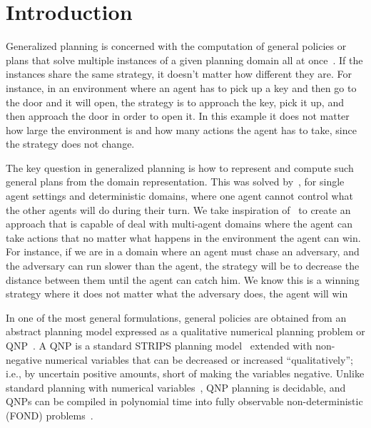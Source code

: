 \documentclass[a4paper]{article}
\begin{document}
\section{Introduction}

Generalized planning is concerned with the computation of general policies or plans that solve multiple instances of a given planning domain all at once~\cite{srivastava2008network, ramirez2009plan, belle2016foundations, aguas2016generalized}. If the instances share the same strategy, it doesn't matter how different they are. For instance, in an environment where an agent has to pick up a key and then go to the door and it will open, the strategy is to approach the key, pick it up, and then approach the door in order to open it. In this example it does not matter how large the environment is and how many actions the agent has to take, since the strategy does not change.

The key question in generalized planning is how to represent and compute such general plans from the domain representation. This was solved by~\cite{frances2021learning}, for single agent settings and deterministic domains, where one agent cannot control what the other agents will do during their turn. We take inspiration of~\cite{frances2021learning} to create an approach that is capable of deal with multi-agent domains where the agent can take actions that no matter what happens in the environment the agent can win. For instance, if we are in a domain where an agent must chase an adversary, and the adversary can run slower than the agent, the strategy will be to decrease the distance between them until the agent can catch him. We know this is a winning strategy where it does not matter what the adversary does, the agent will win

In one of the most general formulations, general policies are obtained from an abstract planning model expressed as a qualitative numerical planning problem or QNP~\cite{srivastava2008network}. A QNP is a standard STRIPS planning model~\cite{fikes1971strips, bylander1994computational} extended with non-negative numerical variables that can be decreased or increased “qualitatively”; i.e., by uncertain positive amounts, short of making the variables negative. Unlike standard planning with numerical variables~\cite{helmert2002decidability}, QNP planning is decidable, and QNPs can be compiled in polynomial time into fully observable non-deterministic (FOND) problems~\cite{bonet2020high}.
\end{document}
